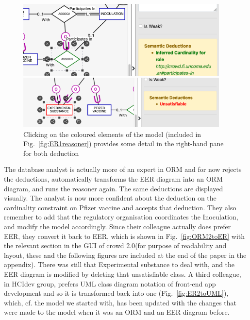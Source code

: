 \documentclass[sn-mathphys]{sn-jnl}
\newcommand{\crowdtwo}{{\sf crowd 2.0}\xspace}
\begin{document}
\begin{figure}[h]
  \centering
      \includegraphics[width=0.95\textwidth]{covidER1card.pdf} 
      
      \vspace{1mm}
      
            \includegraphics[width=0.95\textwidth]{covidER1unsat.pdf} 
            
    \caption{Clicking on the coloured elements of the model (included in Fig.~\ref{fig:ER1reasoner}) provides some detail in the right-hand pane for both deduction}
    \label{fig:ER1reasonerexplain}
\end{figure}

The database analyst is actually more of an expert in ORM and for now rejects the deductions, automatically transforms the EER diagram into an ORM diagram, and runs the reasoner again. The same deductions are displayed visually. The analyst is now more confident about the deduction on the cardinality constraint on  {\sf Pfizer vaccine} and accepts that deduction. They also remember to add that the regulatory organisation {\sf coordinates} the {\sf Inoculation}, and modify the model accordingly. Since their colleague actually does prefer EER, they convert it back to EER, which is shown in Fig.~\ref{fig:ORM2toER} with the relevant section in the GUI of \crowdtwo (for purpose of readability and layout, these and the following figures are included at the end of the paper in the appendix). There was still that {\sf Experimental substance} to deal with, and the EER diagram is modified by deleting that unsatisfiable class. A third colleague, in HCIdev group, prefers UML class diagram notation of front-end app development and so it is transformed back into one (Fig.~\ref{fig:ER2toUML}), which, cf. the model we started with, has been updated with the changes that were made to the model when it was an ORM and an EER diagram before. 
\end{document}
